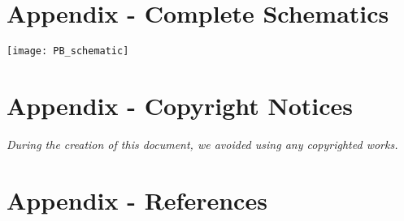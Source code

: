 \section{Appendix - Complete Schematics}

\label{apx:base-station-sch}
%
\texttt{[image: PB\_schematic]}
\label{apx:power-board-sch}

\label{apx:control-module-sch}

\section{Appendix - Copyright Notices}
\emph{During the creation of this document, we avoided using any copyrighted works.}

\thispagestyle{empty}
\pagestyle{empty}

\section{Appendix - References}

\renewcommand{\refname}{\centerline{\Large\bf References Cited}}


